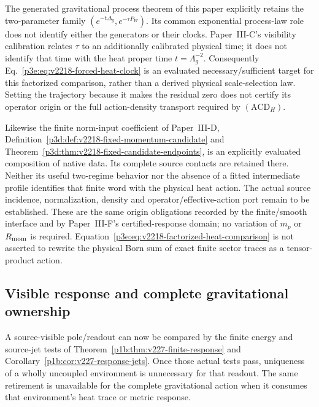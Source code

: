 \documentclass[12pt,a4paper]{article}
\begin{document}
\begin{remark}
\label{p3e:rem:v2218-fixed-origin-status}
The generated gravitational process theorem of this paper explicitly
retains the two-parameter family
\((e^{-t\Delta_g},e^{-\tau P_W})\).  Its common exponential
process-law role does not identify either the generators or their
clocks.  Paper~III-C's visibility calibration relates \(\tau\) to
an additionally calibrated physical time; it does not identify that
time with the heat proper time \(t=\Lambda_g^{-2}\).  Consequently
Eq.~\eqref{p3e:eq:v2218-forced-heat-clock} is an evaluated
necessary/sufficient target for this factorized comparison, rather
than a derived physical scale-selection law.  Setting the trajectory
because it makes the residual zero does not certify its operator
origin or the full action-density transport required by
\((\mathrm{ACD}_H)\).

Likewise the finite norm-input coefficient of Paper~III-D,
Definition~\ref{p3d:def:v2218-fixed-momentum-candidate} and
Theorem~\ref{p3d:thm:v2218-fixed-candidate-endpoints}, is an explicitly
evaluated composition of native data.  Its complete source contacts
are retained there.  Neither its useful two-regime behavior nor the
absence of a fitted intermediate profile identifies that finite word
with the physical heat action.  The actual source incidence,
normalization, density and operator/effective-action port remain to
be established.  These are the same origin obligations recorded by
the finite/smooth interface and by Paper~III-F's certified-response
domain; no variation of \(m_p\) or \(R_{\rm mom}\) is required.
Equation~\eqref{p3e:eq:v2218-factorized-heat-comparison} is not
asserted to rewrite the physical Born sum of exact finite sector
traces as a tensor-product action.
\end{remark}

\subsection{Visible response and complete gravitational ownership}
\label{p3e:sec:v227-gravity-visible}
A source-visible pole/readout can now be compared by the finite energy
and source-jet tests of Theorem~\ref{p1b:thm:v227-finite-response} and
Corollary~\ref{p1b:cor:v227-response-jets}. Once those actual tests pass,
uniqueness of a wholly uncoupled environment is unnecessary for that
readout. The same retirement is unavailable for the complete gravitational
action when it consumes that environment's heat trace or metric response.
\end{document}
